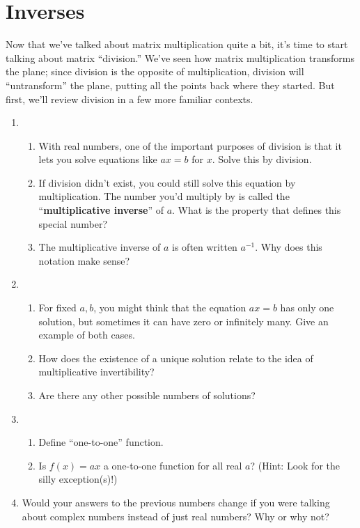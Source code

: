 \documentclass[../gatm.tex]{subfiles}
\begin{document}
\section{Inverses}
\setcounter{problem_i}{0}

Now that we've talked about matrix multiplication quite a bit, it's time to start talking about matrix ``division.'' We've seen how matrix multiplication transforms the plane; since division is the opposite of multiplication, division will ``untransform'' the plane, putting all the points back where they started. But first, we'll review division in a few more familiar contexts.

\begin{enumerate}
\setcounter{enumi}{\value{problem_i}}
\item \begin{enumerate}
\item With real numbers, one of the important purposes of division is that it lets you solve equations like $ax=b$ for $x$. Solve this by division.
\item If division didn't exist, you could still solve this equation by multiplication. The number you'd multiply by is called the ``\textbf{multiplicative inverse}'' of $a$. What is the property that defines this special number?
\item The multiplicative inverse of $a$ is often written $a^{-1}$. Why does this notation make sense?
\end{enumerate}
\item \begin{enumerate}
\item For fixed $a,b$, you might think that the equation $ax=b$ has only one solution, but sometimes it can have zero or infinitely many. Give an example of both cases.
\item How does the existence of a unique solution relate to the idea of multiplicative invertibility?
\item Are there any other possible numbers of solutions?
\end{enumerate}
\item \begin{enumerate}
\item Define ``one-to-one'' function.
\item Is $f(x)=ax$ a one-to-one function for all real $a$? (Hint: Look for the silly exception(s)!)
\end{enumerate}
\item Would your answers to the previous numbers change if you were talking about complex numbers instead of just real numbers? Why or why not?
\setcounter{problem_i}{\value{enumi}}
\end{enumerate}
\end{document}
